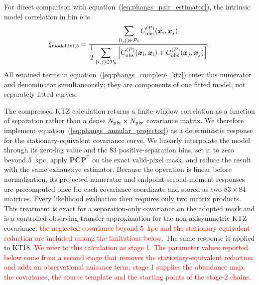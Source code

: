 \documentclass[fleqn,usenatbib]{mnras}
\newcommand{\bs}[1]{\boldsymbol{#1}}
\newcommand{\revadd}[1]{\textcolor{red}{#1}}
\newcommand{\revdel}[1]{\textcolor{red}{\sout{#1}}\hspace{0.18em}}
\begin{document}
For direct comparison with equation~(\ref{eq:phangs_pair_estimator}), the intrinsic model correlation in bin $b$ is
\begin{equation}
    \xi_{{\rm model,int},b}=
    \frac{\displaystyle
    \sum_{(i,j)\in{\cal P}_b}C_{\rm obs}^{(P)}(\bs{x}_i,\bs{x}_j)}
    {\displaystyle\frac{1}{2}
    \sum_{(i,j)\in{\cal P}_b}
    \left[C_{\rm obs}^{(P)}(\bs{x}_i,\bs{x}_i)
    +C_{\rm obs}^{(P)}(\bs{x}_j,\bs{x}_j)\right]}.
    \label{eq:phangs_model_pair_average}
\end{equation}
All retained terms in equation~(\ref{eq:phangs_complete_ktz}) enter this numerator and denominator simultaneously; they are components of one fitted model, not separately fitted curves.

The compressed KTZ calculation returns a finite-window correlation as a function of separation rather than a dense $N_{\rm pix}\times N_{\rm pix}$ covariance matrix.  We therefore implement equation~(\ref{eq:phangs_annular_projector}) as a deterministic response for the stationary-equivalent covariance curve.  We linearly interpolate the model through its zero-lag value and the 83 positive-separation bins, set it to zero beyond 5~kpc, apply $\mathbf P\mathbf C\mathbf P^{\mathsf T}$ on the exact valid-pixel mask, and reduce the result with the same exhaustive estimator.  Because the operation is linear before normalisation, its projected numerator and endpoint-second-moment responses are precomputed once for each covariance coordinate and stored as two $83\times84$ matrices.  Every likelihood evaluation then requires only two matrix products.  This treatment is exact for a separation-only covariance on the adopted mask and is a controlled observing-transfer approximation for the non-axisymmetric KTZ covariance\revdel{; the neglected covariance beyond 5~kpc and the stationary-equivalent reduction are included among the limitations below}.  The same response is applied to KT18.\revadd{  We refer to this calculation as stage 1.  The parameter values reported below come from a second stage that removes the stationary-equivalent reduction and adds an observational nuisance term; stage 1 supplies the abundance map, the covariance, the source template and the starting points of the stage-2 chains.}
\end{document}
